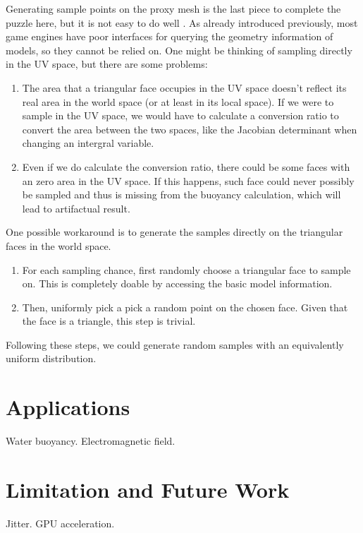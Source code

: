 \documentclass{article}
\begin{document}
Generating sample points on the proxy mesh is the last piece to complete the puzzle here, but it is not easy to do well \cite{ebeida2012uniform}.
As already introduced previously, most game engines have poor interfaces for querying the geometry information of models, so they cannot be relied on.
One might be thinking of sampling directly in the UV space, but there are some problems:
\begin{enumerate}
	\item
		The area that a triangular face occupies in the UV space doesn't reflect its real area in the world space (or at least in its local space).
		If we were to sample in the UV space, we would have to calculate a conversion ratio to convert the area between the two spaces, like the Jacobian determinant when changing an intergral variable.
	\item Even if we do calculate the conversion ratio, there could be some faces with an zero area in the UV space.
		If this happens, such face could never possibly be sampled and thus is missing from the buoyancy calculation, which will lead to artifactual result.
\end{enumerate}

One possible workaround is to generate the samples directly on the triangular faces in the world space.
\begin{enumerate}
	\item For each sampling chance, first randomly choose a triangular face to sample on.
		This is completely doable by accessing the basic model information.
	\item Then, uniformly pick a pick a random point on the chosen face.
		Given that the face is a triangle, this step is trivial.
\end{enumerate}

Following these steps, we could generate random samples with an equivalently uniform distribution.

\section{Applications}
\label{section:applications}

Water buoyancy.
Electromagnetic field.

\section{Limitation and Future Work}

Jitter.
GPU acceleration.
\end{document}
